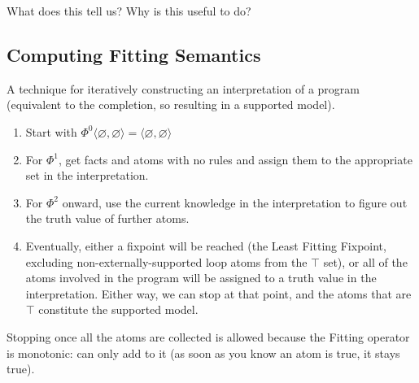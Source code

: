 \documentclass[9pt,a4paper,landscape]{article}
\begin{document}
{\begin{center}
\begin{tabular}{p{3cm}p{5cm}p{6cm}}
	\end{tabular}
\end{center}

What does this tell us? Why is this useful to do?

\pagebreak


\subsection{Computing Fitting Semantics}
\label{subsec:fitting-sem}

A technique for iteratively constructing an interpretation of a program (equivalent to the completion, so resulting in a supported model).

\begin{enumerate}[noitemsep]
	\item Start with $\Phi^0 \langle \varnothing, \varnothing \rangle = \langle \varnothing, \varnothing \rangle$
	\item For $\Phi^1$, get facts and atoms with no rules and assign them to the appropriate set in the interpretation.
	\item For  $\Phi^2$ onward, use the current knowledge in the interpretation to figure out the truth value of further atoms.
	\item Eventually, either a fixpoint will be reached (the Least Fitting Fixpoint, excluding non-externally-supported loop atoms from the $\top$ set), or all of the atoms involved in the program will be assigned to a truth value in the interpretation. Either way, we can stop at that point, and the atoms that are $\top$ constitute the supported model.
\end{enumerate}

Stopping once all the atoms are collected is allowed because the Fitting operator is monotonic: can only add to it (as soon as you know an atom is true, it stays true).

}
\end{document}
